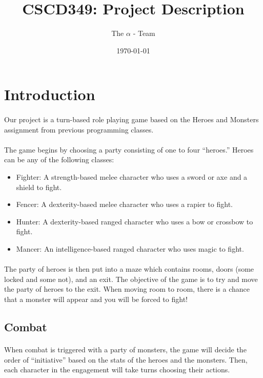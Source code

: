 \documentclass{article}
\title{CSCD349: Project Description}
\author{The $\alpha$ - Team}
\date{\today}
\begin{document}
\maketitle{}

\section{Introduction}

\paragraph{}
Our project is a turn-based role playing game based on the Heroes and Monsters assignment from previous programming classes.

\paragraph{}
The game begins by choosing a party consisting of one to four ``heroes.'' Heroes can be any of the following classes:
\begin{itemize}
\item Fighter: A strength-based melee character who uses a sword or axe and a shield to fight.
\item Fencer: A dexterity-based melee character who uses a rapier to fight.
\item Hunter: A dexterity-based ranged character who uses a bow or crossbow to fight.
\item Mancer: An intelligence-based ranged character who uses magic to fight.
\end{itemize}

\paragraph{}
The party of heroes is then put into a maze which contains rooms, doors (some locked and some not), and an exit. The objective of the game is to try and move the party of heroes to the exit. When moving room to room, there is a chance that a monster will appear and you will be forced to fight!

\subsection{Combat}

\paragraph{}
When combat is triggered with a party of monsters, the game will decide the order of ``initiative'' based on the stats of the heroes and the monsters. Then, each character in the engagement will take turns choosing their actions.
\end{document}
